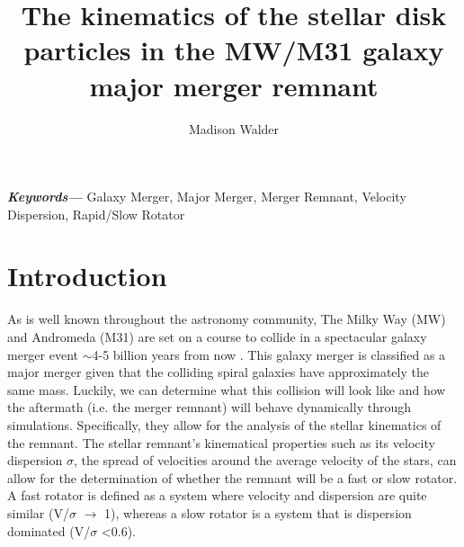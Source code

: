 \documentclass[twocolumn]{aastex63}
\providecommand{\keywords}[1]
{
  \small	
  \textbf{\textit{Keywords---}} #1
}
\begin{document}
\title{The kinematics of the stellar disk particles in the MW/M31 galaxy major merger remnant}

\keywords{Galaxy Merger, Major Merger, Merger Remnant, Velocity Dispersion, Rapid/Slow Rotator}





\author{Madison Walder}



\section{Introduction} \label{sec:intro}

As is well known throughout the astronomy community, The Milky Way (MW) and Andromeda (M31) are set on a course to collide in a spectacular galaxy merger event $\sim$4-5 billion years from now \citep{2012ApJ...753....8V}.  This galaxy merger is classified as a major merger given that the colliding spiral galaxies have approximately the same mass. Luckily, we can determine what this collision will look like and how the aftermath (i.e. the merger remnant) will behave dynamically through simulations.  Specifically, they allow for the analysis of the stellar kinematics of the remnant.  The stellar remnant's kinematical properties such as its velocity dispersion $\sigma$, the spread of velocities around the average velocity of the stars, can allow for the determination of whether the remnant will be a fast or slow rotator.  A fast rotator is defined as a system where velocity and dispersion are quite similar (V/$\sigma$ $\rightarrow$ 1), whereas a slow rotator is a system that is dispersion dominated (V/$\sigma$ \textless 0.6). 
\end{document}
